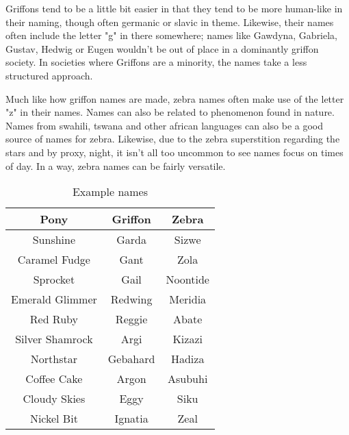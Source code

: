 \documentclass[11pt,a4paper,twocolumn]{book}
\begin{document}
   Griffons tend to be a little bit easier in that they tend to be more human-like in their naming, though often germanic or slavic in theme. Likewise, their names often include the letter "g" in there somewhere; names like Gawdyna, Gabriela, Gustav, Hedwig or Eugen wouldn't be out of place in a dominantly griffon society. In societies where Griffons are a minority, the names take a less structured approach.
   
   Much like how griffon names are made, zebra names often make use of the letter "z" in their names. Names can also be related to phenomenon found in nature. Names from swahili, tswana and other african languages can also be a good source of names for zebra. Likewise, due to the zebra superstition regarding the stars and by proxy, night, it isn't all too uncommon to see names focus on times of day. In a way, zebra names can be fairly versatile.
   
    \begin{table*}[t]
        \centering
        \caption{Example names}
        \begin{tabular}{|c|c|c|}
           \hline
           \textbf{Pony}            & \textbf{Griffon}  & \textbf{Zebra} \\    \hline
                Sunshine            & Garda             & Sizwe        \\
                Caramel Fudge       & Gant              & Zola            \\
                Sprocket            & Gail              & Noontide             \\
                Emerald Glimmer     & Redwing           & Meridia              \\
                Red Ruby            & Reggie            & Abate               \\
                Silver Shamrock     & Argi              & Kizazi          \\
                Northstar           & Gebahard          & Hadiza             \\
                Coffee Cake         & Argon             & Asubuhi         \\
                Cloudy Skies        & Eggy              & Siku     \\
                Nickel Bit          & Ignatia           & Zeal     \\ \hline
        \end{tabular}
        \label{tab:my_label}
    \end{table*}
    
\end{document}
